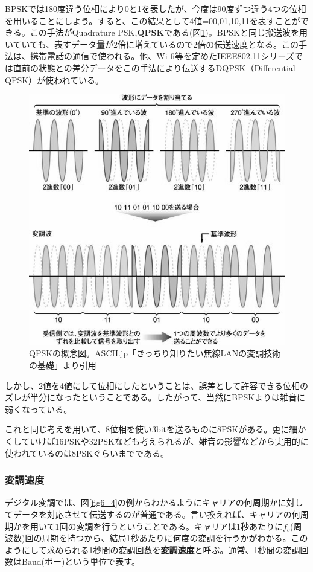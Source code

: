 BPSKでは180度違う位相により0と1を表したが、今度は90度ずつ違う4つの位相を用いることにしよう。すると、この結果として4値=00,01,10,11を表すことができる。この手法がQuadrature PSK,\textbf{QPSK}である(図\ref{fig6_6})。BPSKと同じ搬送波を用いていても、表すデータ量が2倍に増えているので2倍の伝送速度となる。この手法は、携帯電話の通信で使われる。他、Wi-fi等を定めたIEEE802.11シリーズでは直前の状態との差分データをこの手法により伝送するDQPSK（Differential QPSK）が使われている。

\begin{figure}[htb]
\centering
\includegraphics[width=0.8\linewidth,keepaspectratio,bb=0 0 588 575]{fig/fig6_6.jpg}
\caption{QPSKの概念図。ASCII.jp「きっちり知りたい無線LANの変調技術の基礎」より引用}\label{fig6_6}
\end{figure}

しかし、2値を4値にして位相にしたということは、誤差として許容できる位相のズレが半分になったということである。したがって、当然にBPSKよりは雑音に弱くなっている。

これと同じ考えを用いて、8位相を使い3bitを送るものに8PSKがある。更に細かくしていけば16PSKや32PSKなども考えられるが、雑音の影響などから実用的に使われているのは8PSKぐらいまでである。

\subsubsection{変調速度}

デジタル変調では、図\ref{fig6_4}の例からわかるようにキャリアの何周期かに対してデータを対応させて伝送するのが普通である。言い換えれば、キャリアの何周期かを用いて1回の変調を行うということである。キャリアは1秒あたりに$f_c$(周波数)回の周期を持つから、結局1秒あたりに何度の変調を行うかがわかる。このようにして求められる1秒間の変調回数を\textbf{変調速度}と呼ぶ。通常、1秒間の変調回数はBaud(ボー)という単位で表す。

